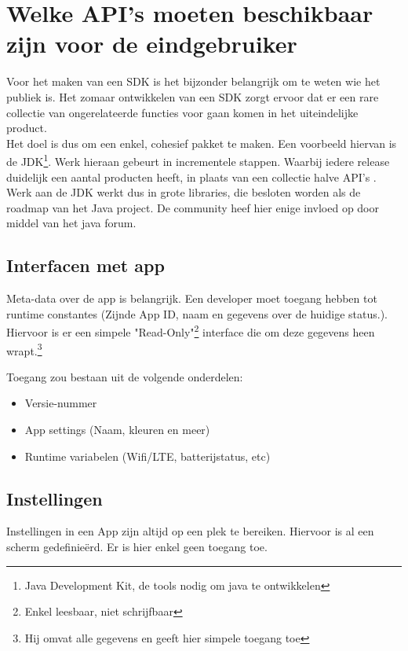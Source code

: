 \chapter{Welke API's moeten beschikbaar zijn voor de eindgebruiker}

Voor het maken van een SDK is het bijzonder belangrijk om te weten wie het publiek is. Het zomaar ontwikkelen van een SDK zorgt ervoor dat er een rare collectie van ongerelateerde functies voor gaan komen in het uiteindelijke product. \\

Het doel is dus om een enkel, cohesief pakket te maken. Een voorbeeld hiervan is de JDK\footnote{Java Development Kit, de tools nodig om java te ontwikkelen}. Werk hieraan gebeurt in incrementele stappen. Waarbij iedere release duidelijk een aantal producten heeft, in plaats van een collectie halve API's \cite{wikip1}. \\

Werk aan de JDK werkt dus in grote libraries, die besloten worden als de roadmap van het Java project. De community heef hier enige invloed op door middel van het java forum.

\section{Interfacen met app}

Meta-data over de app is belangrijk. Een developer moet toegang hebben tot runtime constantes (Zijnde App ID, naam en gegevens over de huidige status.). Hiervoor is er een simpele "Read-Only"\footnote{Enkel leesbaar, niet schrijfbaar} interface die om deze gegevens heen wrapt.\footnote{Hij omvat alle gegevens en geeft hier simpele toegang toe}

Toegang zou bestaan uit de volgende onderdelen:

\begin{itemize}
	\item Versie-nummer
	\item App settings (Naam, kleuren en meer)
	\item Runtime variabelen (Wifi/LTE, batterijstatus, etc)
\end{itemize}

\section{Instellingen}

Instellingen in een App zijn altijd op een plek te bereiken. Hiervoor is al een scherm gedefinie\"{e}rd. Er is hier enkel geen toegang toe. \\

